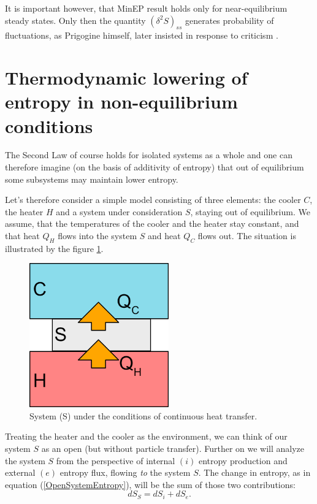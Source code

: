 \documentclass[a4paper,12pt]{article}
\begin{document}
It is important however, that MinEP result holds only for near-equilibrium steady states. Only then the quantity $ (\delta^2 S)_{ss} $ generates probability of fluctuations, as Prigogine himself, later insisted in response to criticism \cite{Nicolis:1979cv}.


\section{Thermodynamic lowering of entropy in non-equilibrium conditions}
\label{simple-model}

The Second Law of course holds for isolated systems as a whole and one can therefore imagine (on the basis of additivity of entropy) that out of equilibrium some subsystems may maintain lower entropy.

Let's therefore consider a simple model consisting of three elements: the cooler $C$, the heater $H$ and a system under consideration $S$, staying out of equilibrium.
We assume, that the temperatures of the cooler and the heater stay constant, and that heat $Q_H$ flows into the system $S$ and heat $Q_C$ flows out. The situation is illustrated by the figure \ref{Fig2}.
\begin{figure}[ht!]
\centering \includegraphics[width=6cm]{system} \caption{System (S) under the conditions of continuous heat transfer.}
\label{Fig2} 
\end{figure}
Treating the heater and the cooler as the environment, we can think of our system $S$ as an open (but without particle transfer).
Further on we will analyze the system $S$ from the perspective of internal $(i)$ entropy production and external $(e)$ entropy flux, flowing \emph{to} the system $S$. 
The change in entropy, as in equation (\ref{OpenSystemEntropy}), will be the sum of those two contributions:
\begin{equation}
dS_S=dS_i+dS_e.
\label{entrosum}
\end{equation}
\end{document}

